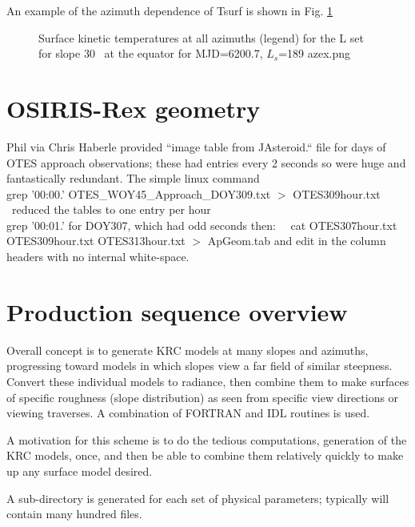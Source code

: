\documentclass{article}
\begin{document}
An example of the azimuth dependence of Tsurf is shown in Fig. 
\ref{azex}
\begin{figure}[!ht] 
\caption[Example of azimuth set]{Surface kinetic temperatures at all azimuths (legend) for the L set for slope 30\qd~ at the equator for MJD=6200.7, $L_s$=189 
\label{azex}  azex.png  }
\end{figure} 


\section{OSIRIS-Rex geometry}
Phil via Chris Haberle provided  ``image table from JAsteroid.`` file for 
 days of OTES approach observations; these had entries every 2 seconds so were huge and fantastically redundant. The simple linux command  
\\  grep '00:00.' OTES_WOY45_Approach_DOY309.txt $>$ OTES309hour.txt  \ reduced the tables to one entry per hour
\\  grep '00:01.' for DOY307, which had odd seconds
\qi then: \ \  cat OTES307hour.txt  OTES309hour.txt OTES313hour.txt $>$ ApGeom.tab
\qii and edit in the column headers with no internal white-space.

\section{Production sequence overview  } %
Overall concept is to generate KRC models at many slopes and azimuths,
progressing toward models in which slopes view a far field of similar
steepness. Convert these individual models to radiance, then combine them to
make surfaces of specific roughness (slope distribution) as seen from specific
view directions or viewing traverses. A combination of FORTRAN and IDL routines
is used.

A motivation for this scheme is to do the tedious computations, generation of
the KRC models, once, and then be able to combine them relatively quickly to
make up any surface model desired.

A sub-directory is generated for each set of physical parameters; typically will
contain many hundred files.
\end{document}
